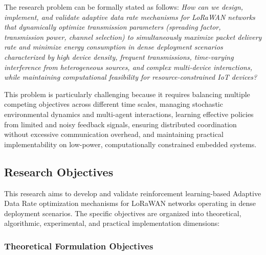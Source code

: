 \documentclass[12pt,a4paper]{article}
\begin{document}
The research problem can be formally stated as follows: \textit{How can we design, implement, and validate adaptive data rate mechanisms for LoRaWAN networks that dynamically optimize transmission parameters (spreading factor, transmission power, channel selection) to simultaneously maximize packet delivery rate and minimize energy consumption in dense deployment scenarios characterized by high device density, frequent transmissions, time-varying interference from heterogeneous sources, and complex multi-device interactions, while maintaining computational feasibility for resource-constrained IoT devices?}

This problem is particularly challenging because it requires balancing multiple competing objectives across different time scales, managing stochastic environmental dynamics and multi-agent interactions, learning effective policies from limited and noisy feedback signals, ensuring distributed coordination without excessive communication overhead, and maintaining practical implementability on low-power, computationally constrained embedded systems.

\subsection{Research Objectives}
\label{subsec:research_objectives}

This research aims to develop and validate reinforcement learning-based Adaptive Data Rate optimization mechanisms for LoRaWAN networks operating in dense deployment scenarios. The specific objectives are organized into theoretical, algorithmic, experimental, and practical implementation dimensions:

\subsubsection{Theoretical Formulation Objectives}
\end{document}
